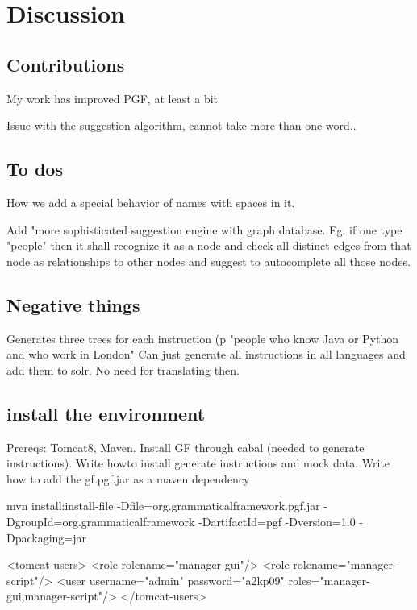 \chapter{Discussion}\label{ch:discussion}

\section{Contributions}
My work has improved PGF, at least a bit


Issue with the suggestion algorithm, cannot take more than one word..

\section{To dos}
How we add a special behavior of names with spaces in it.

Add "more sophisticated suggestion engine with graph database. Eg. if one type "people" then it shall recognize it as a node and check all distinct edges from that node as relationships to other nodes and suggest to autocomplete all those nodes.
\section{Negative things}
Generates three trees for each instruction (p "people who know Java or Python and who work in London"
Can just generate all instructions in all languages and add them to solr. No need for translating then.

\section{install the environment}
Prereqs: Tomcat8, Maven. Install GF through cabal (needed to generate instructions). Write howto install generate instructions and mock data. Write how to add the gf.pgf.jar as a maven dependency

mvn install:install-file -Dfile=org.grammaticalframework.pgf.jar -DgroupId=org.grammaticalframework -DartifactId=pgf -Dversion=1.0 -Dpackaging=jar

<tomcat-users>
<role rolename="manager-gui"/>
  <role rolename="manager-script"/>
  <user username="admin" password="a2kp09" roles="manager-gui,manager-script"/>
</tomcat-users>


